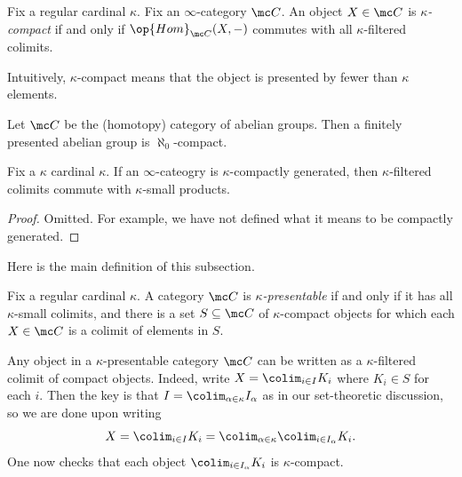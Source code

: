 \documentclass[../notes.tex]{subfiles}
\begin{document}
\begin{definition}[compact]
	Fix a regular cardinal $\kappa$. Fix an $\infty$-category $\mc C$. An object $X\in\mc C$ is \textit{$\kappa$-compact} if and only if $\op{Hom}_{\mc C}(X,-)$ commutes with all $\kappa$-filtered colimits.
\end{definition}
\begin{remark}
	Intuitively, $\kappa$-compact means that the object is presented by fewer than $\kappa$ elements.
\end{remark}
\begin{example}
	Let $\mc C$ be the (homotopy) category of abelian groups. Then a finitely presented abelian group is $\aleph_0$-compact.
\end{example}
\begin{proposition}
	Fix a $\kappa$ cardinal $\kappa$. If an $\infty$-cateogry is $\kappa$-compactly generated, then $\kappa$-filtered colimits commute with $\kappa$-small products.
\end{proposition}
\begin{proof}
	Omitted. For example, we have not defined what it means to be compactly generated.
\end{proof}
Here is the main definition of this subsection.
\begin{definition}[presentable]
	Fix a regular cardinal $\kappa$. A category $\mc C$ is \textit{$\kappa$-presentable} if and only if it has all $\kappa$-small colimits, and there is a set $S\subseteq\mc C$ of $\kappa$-compact objects for which each $X\in\mc C$ is a colimit of elements in $S$.
\end{definition}
\begin{remark}
	Any object in a $\kappa$-presentable category $\mc C$ can be written as a $\kappa$-filtered colimit of compact objects. Indeed, write $X=\colim_{i\in I}K_i$ where $K_i\in S$ for each $i$. Then the key is that $I=\colim_{\alpha\in\kappa} I_\alpha$ as in our set-theoretic discussion, so we are done upon writing
	\[X=\colim_{i\in I}K_i=\colim_{\alpha\in\kappa}\colim_{i\in I_\alpha}K_i.\]
	One now checks that each object $\colim_{i\in I_\alpha}K_i$ is $\kappa$-compact.
\end{remark}
\end{document}
